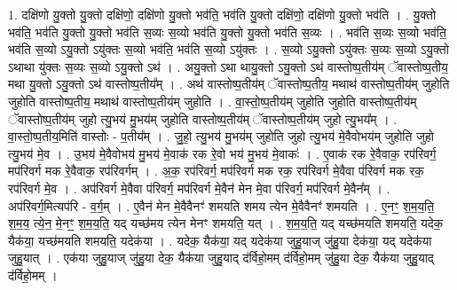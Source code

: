 \documentclass[17pt]{extarticle}
\begin{document}
1. दक्षि॑णो यु॒क्तो यु॒क्तो दक्षि॑णो॒ दक्षि॑णो यु॒क्तो भव॑ति॒ भव॑ति यु॒क्तो दक्षि॑णो॒ दक्षि॑णो यु॒क्तो भव॑ति । . यु॒क्तो भव॑ति॒ भव॑ति यु॒क्तो यु॒क्तो भव॑ति स॒व्यः स॒व्यो भव॑ति यु॒क्तो यु॒क्तो भव॑ति स॒व्यः । . भव॑ति स॒व्यः स॒व्यो भव॑ति॒ भव॑ति स॒व्यो ऽयु॒क्तो ऽयु॑क्तः स॒व्यो भव॑ति॒ भव॑ति स॒व्यो ऽयु॑क्तः । . स॒व्यो ऽयु॒क्तो ऽयु॑क्तः स॒व्यः स॒व्यो ऽयु॒क्तो ऽथाथा यु॑क्तः स॒व्यः स॒व्यो ऽयु॒क्तो ऽथ॑ । . अयु॒क्तो ऽथा थायु॒क्तो ऽयु॒क्तो ऽथ॑ वास्तोष्प॒तीय॑म् ॅवास्तोष्प॒तीय॒ मथा यु॒क्तो ऽयु॒क्तो ऽथ॑ वास्तोष्प॒तीय᳚म् । . अथ॑ वास्तोष्प॒तीय॑म् ॅवास्तोष्प॒तीय॒ मथाथ॑ वास्तोष्प॒तीय॑म् जुहोति जुहोति वास्तोष्प॒तीय॒ मथाथ॑ वास्तोष्प॒तीय॑म् जुहोति । . वा॒स्तो॒ष्प॒तीय॑म् जुहोति जुहोति वास्तोष्प॒तीय॑म् ॅवास्तोष्प॒तीय॑म् जुहो त्यु॒भय॑ मु॒भय॑म् जुहोति 
वास्तोष्प॒तीय॑म् ॅवास्तोष्प॒तीय॑म् जुहो त्यु॒भय᳚म् । . वा॒स्तो॒ष्प॒तीय॒मिति॑ वास्तोः - प॒तीय᳚म् । . जु॒हो॒ त्यु॒भय॑ मु॒भय॑म् जुहोति जुहो त्यु॒भय॑ मे॒वैवोभय॑म् जुहोति जुहो त्यु॒भय॑ मे॒व । . उ॒भय॑ मे॒वैवोभय॑ मु॒भय॑ मे॒वाक॑ रक रे॒वो भय॑ मु॒भय॑ मे॒वाकः॑ । . ए॒वाक॑ रक रे॒वैवाक॒ रप॑रिवर्ग॒ मप॑रिवर्ग मक रे॒वैवाक॒ रप॑रिवर्गम् । . अ॒क॒ रप॑रिवर्ग॒ मप॑रिवर्ग मक रक॒ रप॑रिवर्ग मे॒वैवा प॑रिवर्ग मक रक॒ रप॑रिवर्ग मे॒व । . अप॑रिवर्ग मे॒वैवा प॑रिवर्ग॒ मप॑रिवर्ग मे॒वैन॑ मेन मे॒वा प॑रिवर्ग॒ मप॑रिवर्ग मे॒वैन᳚म् । . अप॑रिवर्ग॒मित्यप॑रि - व॒र्ग॒म् । . ए॒वैन॑ मेन मे॒वैवैनꣳ॑ शमयति शमय त्येन मे॒वैवैनꣳ॑ शमयति । . ए॒नꣳ॒॒ श॒म॒य॒ति॒ श॒म॒य॒ त्ये॒न॒ मे॒नꣳ॒॒ श॒म॒य॒ति॒ यद् यच्छ॑मय त्येन मेनꣳ शमयति॒ यत् । . श॒म॒य॒ति॒ यद् यच्छ॑मयति शमयति॒ यदेक॒ यैक॑या॒ यच्छ॑मयति शमयति॒ यदेक॑या । . यदेक॒ यैक॑या॒ यद् यदेक॑या जुहु॒याज् जु॑हु॒या देक॑या॒ यद् यदेक॑या जुहु॒यात् । . एक॑या जुहु॒याज् जु॑हु॒या देक॒ यैक॑या जुहु॒याद् द॑र्विहो॒मम् द॑र्विहो॒मम् जु॑हु॒या देक॒ यैक॑या जुहु॒याद् द॑र्विहो॒मम् । \newline
\end{document}
